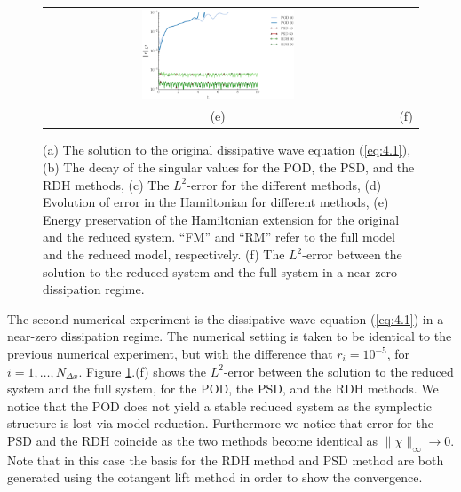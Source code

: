 \begin{figure}[t]
\begin{tabular}{cc}
\includegraphics[width=0.45\textwidth]{./figs/wave/error_homo} \\
(e) & (f) 
\end{tabular}
\caption{(a) The solution to the original dissipative wave equation (\ref{eq:4.1}), (b) The decay of the singular values for the POD, the PSD, and the RDH methods, (c) The $L^2$-error for the different methods, (d) Evolution of error in the Hamiltonian for different methods, (e) Energy preservation of the Hamiltonian extension for the original and the reduced system. ``FM'' and ``RM'' refer to the full model and the reduced model, respectively. (f) The $L^2$-error between the solution to the reduced system and the full system in a near-zero dissipation regime.} \label{fig:4.1}
\end{figure}

The second numerical experiment is the dissipative wave equation (\ref{eq:4.1}) in a near-zero dissipation regime. The numerical setting is taken to be identical to the previous numerical experiment, but with the difference that $r_i = 10^{-5}$, for $i=1,\dots,N_{\Delta x}$. Figure \ref{fig:4.1}.(f) shows the $L^2$-error between the solution to the reduced system and the full system, for the POD, the PSD, and the RDH methods. We notice that the POD does not yield a stable reduced system as the symplectic structure is lost via model reduction. Furthermore we notice that error for the PSD and the RDH coincide as the two methods become identical as $\| \chi \|_{\infty}\to 0$. {\edit Note that in this case the basis for the RDH method and PSD method are both generated using the cotangent lift method in order to show the convergence}.


